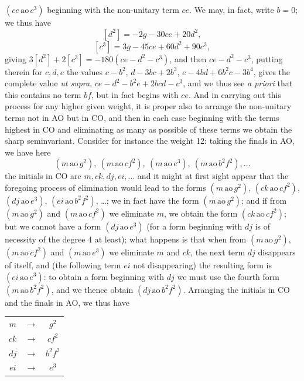 \documentclass[11pt]{article}
\begin{document}
$(ce\,\mathrm{ao}\,c^3)$ beginning with the non-unitary term $ce$. We may, in fact, write $b = 0$; we thus have
\[
[d^2] = -2g - 30ce + 20d^2,
\]
\[
[c^3] = 3g - 45ce + 60d^2 + 90c^3,
\]
giving $3[d^2] + 2[c^3] = -180(ce - d^2 - c^3)$, and then $ce - d^2 - c^3$, putting therein for $c, d, e$ the values $c - b^2$, $d - 3bc + 2b^3$, $e - 4bd + 6b^2c - 3b^4$, gives the complete value \textit{ut supra}, $ce - d^2 - b^2 e + 2bcd - c^3$, and we thus see \textit{a priori} that this contains no term $bf$, but in fact begins with $ce$. And in carrying out this process for any higher given weight, it is proper also to arrange the non-unitary terms not in AO but in CO, and then in each case beginning with the terms highest in CO and eliminating as many as possible of these terms we obtain the sharp seminvariant. Consider for instance the weight 12: taking the finals in AO, we have here
\[
(m\,\mathrm{ao}\,g^2),\ (m\,\mathrm{ao}\,cf^2),\ (m\,\mathrm{ao}\,e^3),\ (m\,\mathrm{ao}\,b^2 f^2),\ldots
\]
the initials in CO are $m, ck, dj, ei, \ldots$ and it might at first sight appear that the foregoing process of elimination would lead to the forms $(m\,\mathrm{ao}\,g^2)$, $(ck\,\mathrm{ao}\,cf^2)$, $(dj\,\mathrm{ao}\,e^3)$, $(ei\,\mathrm{ao}\,b^2 f^2)$, \ldots; we in fact have the form $(m\,\mathrm{ao}\,g^2)$; and if from $(m\,\mathrm{ao}\,g^2)$ and $(m\,\mathrm{ao}\,cf^2)$ we eliminate $m$, we obtain the form $(ck\,\mathrm{ao}\,cf^2)$; but we cannot have a form $(dj\,\mathrm{ao}\,e^3)$ (for a form beginning with $dj$ is of necessity of the degree 4 at least); what happens is that when from $(m\,\mathrm{ao}\,g^2)$, $(m\,\mathrm{ao}\,cf^2)$ and $(m\,\mathrm{ao}\,e^3)$ we eliminate $m$ and $ck$, the next term $dj$ disappears of itself, and (the following term $ei$ not disappearing) the resulting form is $(ei\,\mathrm{ao}\,e^3)$: to obtain a form beginning with $dj$ we must use the fourth form $(m\,\mathrm{ao}\,b^2 f^2)$, and we thence obtain $(dj\,\mathrm{ao}\,b^2 f^2)$. Arranging the initials in CO and the finals in AO, we thus have

\begin{center}
\begin{tabular}{ccc}
$m$ &$\longrightarrow$& $g^2$ \\
$ck$ &$\longrightarrow$& $cf^2$ \\
$dj$ &$\longrightarrow$& $b^2 f^2$ \\
$ei$ &$\longrightarrow$& $e^3$ \\
\end{tabular}
\end{center}
\end{document}
